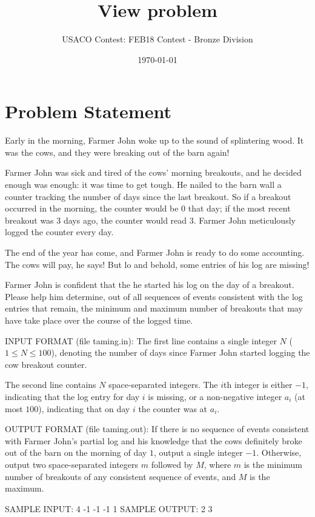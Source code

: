 \documentclass[12pt]{article}
\title{View problem}
\author{USACO Contest: FEB18 Contest - Bronze Division}
\date{\today}
\begin{document}
\maketitle

\section*{Problem Statement}

Early in the morning, Farmer John woke up to the sound of splintering wood. It
was the cows, and they were breaking out of the barn again!

Farmer John was sick and tired of the cows' morning breakouts, and he decided
enough was enough: it was time to get tough. He nailed to the barn wall a
counter tracking the number of days since the last breakout. So if a breakout
occurred in the morning, the counter would be $0$ that day; if the most recent
breakout was $3$ days ago, the counter would read $3$. Farmer John meticulously
logged the counter every day.

The end of the year has come, and Farmer John is ready to do some accounting.
The cows will pay, he says! But lo and behold, some entries of his log are
missing!  

Farmer John is confident that the he started his log on the day of a breakout. 
Please help him determine, out of all sequences of events consistent with the
log entries that remain, the minimum and maximum number of breakouts that may
have take place over the course of the logged time. 

INPUT FORMAT (file taming.in):
The first line contains a single integer $N$ ($1 \leq N \leq 100$), denoting the
number of days since Farmer John started logging the cow breakout counter.

The second line contains $N$ space-separated integers. The $i$th integer is
either $-1$, indicating that the log entry for day $i$ is missing, or a
non-negative integer $a_i$ (at most $100$), indicating that on day $i$ the counter
was at
$a_i$.

OUTPUT FORMAT (file taming.out):
If there is no sequence of events consistent with Farmer John's partial log and
his knowledge that the cows definitely broke out of the barn on the morning of
day $1$, output a single integer $-1$.  Otherwise, output two space-separated
integers $m$ followed by $M$, where $m$ is the minimum number of breakouts of
any consistent sequence of events, and $M$ is the maximum.

SAMPLE INPUT:
4
-1 -1 -1 1
SAMPLE OUTPUT: 
2 3
\end{document}
